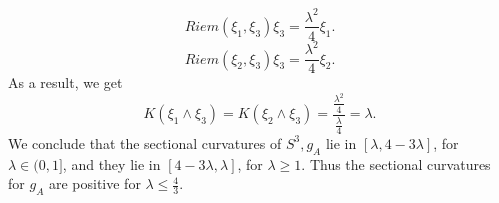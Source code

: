 \documentclass[12pt,reqno]{amsart}\usepackage{amssymb,amsmath,amscd,epsfig,amsthm,enumerate,import,eufrak}
\theoremstyle{definition}
\theoremstyle{remark}
\numberwithin{equation}{section}
\theoremstyle{plain}
\theoremstyle{definition}
\def \vs {\vskip 2mm}
\theoremstyle{remark}
\numberwithin{theorem}{section}
\begin{document}
%
%
\begin{equation} \label{eqn:R13}
	Riem(\xi_1, \xi_3) \xi_3 = \frac{\lambda^2}4 \xi_1.
\end{equation}
%
%
\begin{equation}\label{eqn:R23}
		Riem(\xi_2, \xi_3) \xi_3 = \frac{\lambda^2}4 \xi_2.
\end{equation}
%
%
As a result, we get
%
\begin{equation} \label{eqn:K13}
	K(\xi_1 \wedge \xi_3) = K(\xi_2 \wedge \xi_3) = \frac{\frac{\lambda^2}4}{\frac{\lambda}4} = \lambda.
\end{equation}
%
We conclude that the sectional curvatures of $S^3, g_A$ lie in $[\lambda, 4 - 3 \lambda]$, for $\lambda \in (0, 1]$, and they lie in $[4 - 3\lambda, \lambda]$, for $\lambda \geq 1$. Thus the sectional curvatures for $g_A$ are positive for $\lambda \leq \frac43$.
\vs
%
%
%
%
%
%
%
\end{document}
